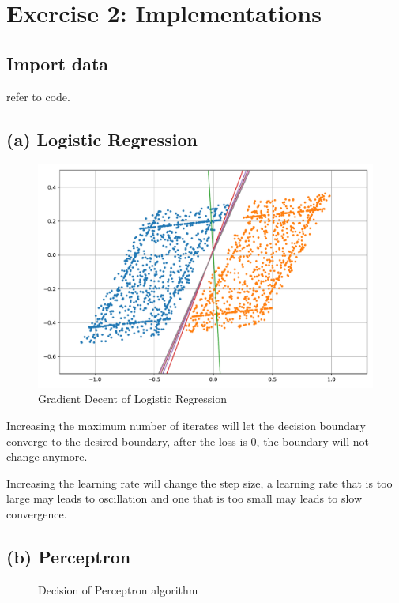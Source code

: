 \documentclass[11pt]{article}
\begin{document}
\section*{Exercise 2: Implementations}

\subsection*{Import data}
refer to code.

\subsection*{(a) Logistic Regression}
\begin{figure}[h]
	\centering
	\includegraphics[width=0.5\linewidth]{logistic}
	\caption{Gradient Decent of Logistic Regression}
\end{figure}

Increasing the maximum number of iterates will let the decision boundary converge to the desired boundary, after the loss is 0, the boundary will not change anymore.

Increasing the learning rate will change the step size, a learning rate that is too large may leads to oscillation and one that is too small may leads to slow convergence.

\subsection*{(b) Perceptron} 
\begin{figure}[h]
	\centering
	\caption{Decision of Perceptron algorithm}
\end{figure}
\end{document}
